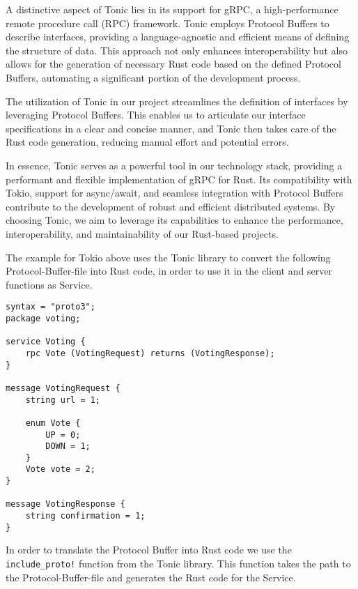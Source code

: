 A distinctive aspect of Tonic lies in its support for gRPC, a high-performance remote procedure call (RPC) framework. Tonic employs Protocol Buffers to describe 
interfaces, providing a language-agnostic and efficient means of defining the structure of data. This approach not only enhances interoperability but also 
allows for the generation of necessary Rust code based on the defined Protocol Buffers, automating a significant portion of the development process.\newline

The utilization of Tonic in our project streamlines the definition of interfaces by leveraging Protocol Buffers. This enables us to articulate our interface 
specifications in a clear and concise manner, and Tonic then takes care of the Rust code generation, reducing manual effort and potential errors.\newline

In essence, Tonic serves as a powerful tool in our technology stack, providing a performant and flexible implementation of gRPC for Rust. Its compatibility with 
Tokio, support for async/await, and seamless integration with Protocol Buffers contribute to the development of robust and efficient distributed systems. By 
choosing Tonic, we aim to leverage its capabilities to enhance the performance, interoperability, and maintainability of our Rust-based projects.\newline

The example for Tokio above uses the Tonic library to convert the following Protocol-Buffer-file into Rust code, in order to use it in the client and server 
functions as Service.

\begin{verbatim}
syntax = "proto3";
package voting;
        
service Voting {
    rpc Vote (VotingRequest) returns (VotingResponse);
}
        
message VotingRequest {
    string url = 1;
        
    enum Vote {
        UP = 0;
        DOWN = 1;
    }
    Vote vote = 2;    
}
        
message VotingResponse {
    string confirmation = 1;
}
\end{verbatim}

In order to translate the Protocol Buffer into Rust code we use the \verb+include_proto!+ function from the Tonic library. This function takes the path to the 
Protocol-Buffer-file and generates the Rust code for the Service.

